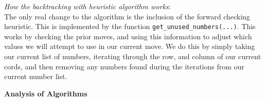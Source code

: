 \documentclass{article}
\begin{document}
\textit{How the backtracking with heuristic algorithm works}: \\

The only real change to the algorithm is the inclusion of the forward checking heuristic.
This is implemented by the function \verb|get_unused_numbers(...)|. This works by checking the prior moves, and
using this information to adjust which values we will attempt to use in our current move. We do this by simply taking our current list 
of numbers, iterating through the row, and column of our current cords, and then removing any numbers found during the iterations from our 
current number list.

\bigskip

\bigskip

\bigskip

\bigskip

\pagebreak 

\noindent \textbf{Analysis of Algorithms}

\bigskip




\bigskip
\end{document}
